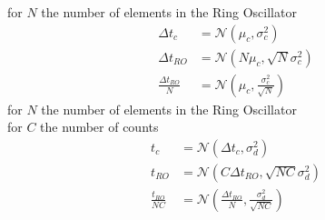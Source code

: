 for $N$ the number of elements in the Ring Oscillator
\begin{align*}
\Delta t_c &= \mathcal{N}(\mu_c,\sigma_c^2)\\
\Delta t_{RO}&= \mathcal{N}(N\mu_c,\sqrt{N}\sigma_{c}^2)\\
\frac{\Delta t_{RO}}{N}&= \mathcal{N}(\mu_c,\frac{\sigma_{c}^2}{\sqrt{N}}) 
\end{align*}
for $N$ the number of elements in the Ring Oscillator\\
for $C$ the number of counts
\begin{align*}
t_c &= \mathcal{N}(\Delta t_c,\sigma_d^2)\\
t_{RO}&= \mathcal{N}(C\Delta t_{RO},\sqrt{NC}\sigma_{d}^2) \\
\frac{t_{RO}}{NC}&= \mathcal{N}(\frac{\Delta t_{RO}}{N},\frac{\sigma_{d}^2}{\sqrt{NC}}) 
\end{align*}